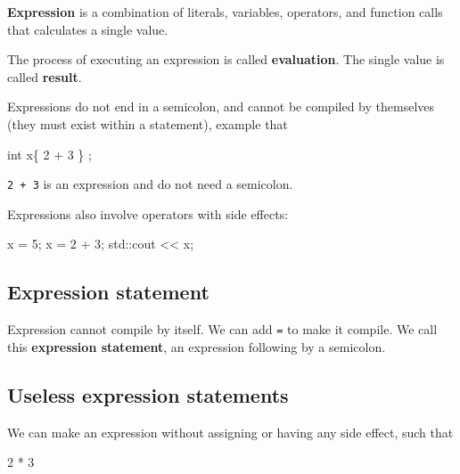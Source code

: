 \documentclass[
  letterpaper,
  DIV=11,
  numbers=noendperiod]{scrreprt}
\newenvironment{Shaded}{\begin{snugshade}}{\end{snugshade}}
\newcommand{\DecValTok}[1]{\textcolor[rgb]{0.68,0.00,0.00}{#1}}
\newcommand{\ErrorTok}[1]{\textcolor[rgb]{0.68,0.00,0.00}{#1}}
\newcommand{\NormalTok}[1]{\textcolor[rgb]{0.00,0.23,0.31}{#1}}
\newcommand{\OtherTok}[1]{\textcolor[rgb]{0.00,0.23,0.31}{#1}}
\newcommand{\SpecialCharTok}[1]{\textcolor[rgb]{0.37,0.37,0.37}{#1}}
\begin{document}
\textbf{Expression} is a combination of literals, variables, operators,
and function calls that calculates a single value.

The process of executing an expression is called \textbf{evaluation}.
The single value is called \textbf{result}.

Expressions do not end in a semicolon, and cannot be compiled by
themselves (they must exist within a statement), example that

\begin{Shaded}
\begin{Highlighting}[]
\NormalTok{int x\{ }\DecValTok{2} \SpecialCharTok{+} \DecValTok{3}\NormalTok{ \} ;}
\end{Highlighting}
\end{Shaded}

\texttt{2\ +\ 3} is an expression and do not need a semicolon.

Expressions also involve operators with side effects:

\begin{Shaded}
\begin{Highlighting}[]
\NormalTok{x }\OtherTok{=} \DecValTok{5}\NormalTok{;}
\NormalTok{x }\OtherTok{=} \DecValTok{2} \SpecialCharTok{+} \DecValTok{3}\NormalTok{;}
\NormalTok{std}\SpecialCharTok{::}\NormalTok{cout }\SpecialCharTok{\textless{}}\ErrorTok{\textless{}}\NormalTok{ x;}
\end{Highlighting}
\end{Shaded}

\hypertarget{expression-statement}{%
\subsection{Expression statement}\label{expression-statement}}

Expression cannot compile by itself. We can add \texttt{=} to make it
compile. We call this \textbf{expression statement}, an expression
following by a semicolon.

\hypertarget{useless-expression-statements}{%
\subsection{Useless expression
statements}\label{useless-expression-statements}}

We can make an expression without assigning or having any side effect,
such that

\begin{Shaded}
\begin{Highlighting}[]
\DecValTok{2} \SpecialCharTok{*} \DecValTok{3}
\end{Highlighting}
\end{Shaded}
\end{document}
